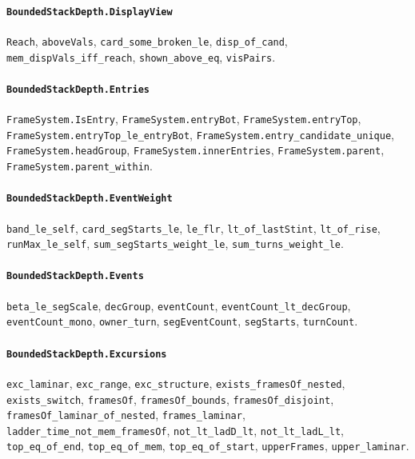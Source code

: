\paragraph{\texttt{BoundedStackDepth.DisplayView}}
{\small\raggedright \texttt{Reach}, \texttt{aboveVals}, \texttt{card\_some\_broken\_le}, \texttt{disp\_of\_cand}, \texttt{mem\_dispVals\_iff\_reach}, \texttt{shown\_above\_eq}, \texttt{visPairs}.\par}

\paragraph{\texttt{BoundedStackDepth.Entries}}
{\small\raggedright \texttt{FrameSystem.IsEntry}, \texttt{FrameSystem.entryBot}, \texttt{FrameSystem.entryTop}, \texttt{FrameSystem.entryTop\_le\_entryBot}, \texttt{FrameSystem.entry\_candidate\_unique}, \texttt{FrameSystem.headGroup}, \texttt{FrameSystem.innerEntries}, \texttt{FrameSystem.parent}, \texttt{FrameSystem.parent\_within}.\par}

\paragraph{\texttt{BoundedStackDepth.EventWeight}}
{\small\raggedright \texttt{band\_le\_self}, \texttt{card\_segStarts\_le}, \texttt{le\_flr}, \texttt{lt\_of\_lastStint}, \texttt{lt\_of\_rise}, \texttt{runMax\_le\_self}, \texttt{sum\_segStarts\_weight\_le}, \texttt{sum\_turns\_weight\_le}.\par}

\paragraph{\texttt{BoundedStackDepth.Events}}
{\small\raggedright \texttt{beta\_le\_segScale}, \texttt{decGroup}, \texttt{eventCount}, \texttt{eventCount\_lt\_decGroup}, \texttt{eventCount\_mono}, \texttt{owner\_turn}, \texttt{segEventCount}, \texttt{segStarts}, \texttt{turnCount}.\par}

\paragraph{\texttt{BoundedStackDepth.Excursions}}
{\small\raggedright \texttt{exc\_laminar}, \texttt{exc\_range}, \texttt{exc\_structure}, \texttt{exists\_framesOf\_nested}, \texttt{exists\_switch}, \texttt{framesOf}, \texttt{framesOf\_bounds}, \texttt{framesOf\_disjoint}, \texttt{framesOf\_laminar\_of\_nested}, \texttt{frames\_laminar}, \texttt{ladder\_time\_not\_mem\_framesOf}, \texttt{not\_lt\_ladD\_lt}, \texttt{not\_lt\_ladL\_lt}, \texttt{top\_eq\_of\_end}, \texttt{top\_eq\_of\_mem}, \texttt{top\_eq\_of\_start}, \texttt{upperFrames}, \texttt{upper\_laminar}.\par}

